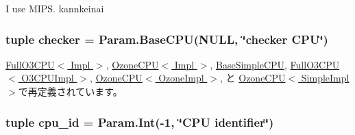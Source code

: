 I use MIPS. kannkeinai \hypertarget{classBaseCPU_a91279baac0a912d72511088f03022a74}{
\subsubsection[{apic\_\-clk\_\-domain}]{}}
\label{classBaseCPU_a91279baac0a912d72511088f03022a74}
\hypertarget{classBaseCPU_ad79de7771e2fdfe4aa9ba3d4f7e6972c}{
\subsubsection[{checker}]{\setlength{\rightskip}{0pt plus 5cm}tuple {\bf checker} = Param.BaseCPU(NULL, \char`\"{}checker CPU\char`\"{})}}
\label{classBaseCPU_ad79de7771e2fdfe4aa9ba3d4f7e6972c}


\hyperlink{classFullO3CPU_a85ab02c76c80bbfce7b3ce7981c55f68}{FullO3CPU$<$ Impl $>$}, \hyperlink{classOzoneCPU_af07b45c0b87d6672f4066d2c189013f9}{OzoneCPU$<$ Impl $>$}, \hyperlink{classBaseSimpleCPU_aaa7fb8cd1a26ae3d37471b17ac031f73}{BaseSimpleCPU}, \hyperlink{classFullO3CPU_a85ab02c76c80bbfce7b3ce7981c55f68}{FullO3CPU$<$ O3CPUImpl $>$}, \hyperlink{classOzoneCPU_af07b45c0b87d6672f4066d2c189013f9}{OzoneCPU$<$ OzoneImpl $>$}, と \hyperlink{classOzoneCPU_af07b45c0b87d6672f4066d2c189013f9}{OzoneCPU$<$ SimpleImpl $>$}で再定義されています。\hypertarget{classBaseCPU_a367f5d07843a54b9454fa6f733fd6d50}{
\subsubsection[{cpu\_\-id}]{\setlength{\rightskip}{0pt plus 5cm}tuple {\bf cpu\_\-id} = Param.Int(-\/1, \char`\"{}CPU identifier\char`\"{})}}
\label{classBaseCPU_a367f5d07843a54b9454fa6f733fd6d50}


